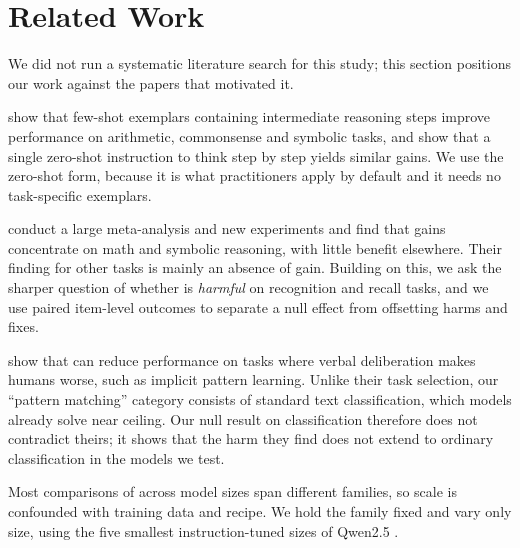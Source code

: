 \section{Related Work}
\label{sec:related}

We did not run a systematic literature search for this study; this section positions our work against the papers that motivated it.

\citet{wei2022chain} show that few-shot exemplars containing intermediate reasoning steps improve performance on arithmetic, commonsense and symbolic tasks, and \citet{kojima2022large} show that a single zero-shot instruction to think step by step yields similar gains.
We use the zero-shot form, because it is what practitioners apply by default and it needs no task-specific exemplars.

\citet{sprague2024cot} conduct a large meta-analysis and new experiments and find that \CoT gains concentrate on math and symbolic reasoning, with little benefit elsewhere.
Their finding for other tasks is mainly an absence of gain.
Building on this, we ask the sharper question of whether \CoT is \emph{harmful} on recognition and recall tasks, and we use paired item-level outcomes to separate a null effect from offsetting harms and fixes.

\citet{liu2024mind} show that \CoT can reduce performance on tasks where verbal deliberation makes humans worse, such as implicit pattern learning.
Unlike their task selection, our ``pattern matching'' category consists of standard text classification, which models already solve near ceiling.
Our null result on classification therefore does not contradict theirs; it shows that the harm they find does not extend to ordinary classification in the models we test.

Most comparisons of \CoT across model sizes span different families, so scale is confounded with training data and recipe.
We hold the family fixed and vary only size, using the five smallest instruction-tuned sizes of Qwen2.5 \cite{qwen2024qwen25}.

